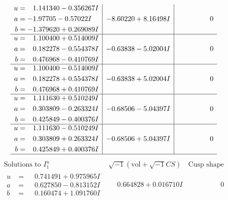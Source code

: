 \documentclass[1p]{elsarticle_modified}
\theoremstyle{definition}
\newcommand{\I}{\sqrt{-1}}
\begin{document}
$$\begin{array}{c|c|c}
\begin{aligned}
u &= \phantom{-}1.141340 - 0.356267 I \\
a &= -1.97705 - 0.57022 I \\
b &= -1.379620 + 0.269089 I\end{aligned}
 & -8.60220 + 8.16498 I & \phantom{-0.000000 } 0 \\ \hline\begin{aligned}
u &= \phantom{-}1.100400 + 0.514009 I \\
a &= \phantom{-}0.182278 - 0.554378 I \\
b &= \phantom{-}0.476968 - 0.410769 I\end{aligned}
 & -0.63838 - 5.02004 I & \phantom{-0.000000 } 0 \\ \hline\begin{aligned}
u &= \phantom{-}1.100400 - 0.514009 I \\
a &= \phantom{-}0.182278 + 0.554378 I \\
b &= \phantom{-}0.476968 + 0.410769 I\end{aligned}
 & -0.63838 + 5.02004 I & \phantom{-0.000000 } 0 \\ \hline\begin{aligned}
u &= \phantom{-}1.111630 + 0.510249 I \\
a &= \phantom{-}0.303809 - 0.263324 I \\
b &= \phantom{-}0.425849 - 0.400376 I\end{aligned}
 & -0.68506 - 5.04397 I & \phantom{-0.000000 } 0 \\ \hline\begin{aligned}
u &= \phantom{-}1.111630 - 0.510249 I \\
a &= \phantom{-}0.303809 + 0.263324 I \\
b &= \phantom{-}0.425849 + 0.400376 I\end{aligned}
 & -0.68506 + 5.04397 I & \phantom{-0.000000 } 0\\
 \hline 
 \end{array}$$\newpage$$\begin{array}{c|c|c}  
\text{Solutions to }I^u_{1}& \I (\text{vol} + \sqrt{-1}CS) & \text{Cusp shape}\\
 \hline 
\begin{aligned}
u &= \phantom{-}0.741491 + 0.975965 I \\
a &= \phantom{-}0.627850 - 0.813152 I \\
b &= \phantom{-}0.160474 + 1.091760 I\end{aligned}
 & \phantom{-}0.664828 + 0.016710 I & \phantom{-0.000000 } 0 \\ \hline\begin{aligned}

\end{aligned}
\end{array}$$
\end{document}
